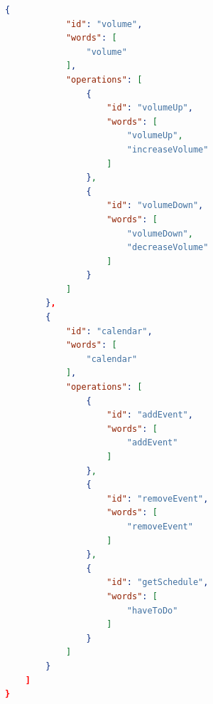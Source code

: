 \documentclass[twoside]{supsistudent}
\begin{document}
\begin{appendices}
\begin{lstlisting}[language=json,firstnumber=1]
        {
            "id": "volume",
            "words": [
                "volume"
            ],
            "operations": [
                {
                    "id": "volumeUp",
                    "words": [
                        "volumeUp",
                        "increaseVolume"
                    ]
                },
                {
                    "id": "volumeDown",
                    "words": [
                        "volumeDown",
                        "decreaseVolume"
                    ]
                }
            ]
        },
        {
            "id": "calendar",
            "words": [
                "calendar"
            ],
            "operations": [
                {
                    "id": "addEvent",
                    "words": [
                        "addEvent"
                    ]
                },
                {
                    "id": "removeEvent",
                    "words": [
                        "removeEvent"
                    ]
                },
                {
                    "id": "getSchedule",
                    "words": [
                        "haveToDo"
                    ]
                }
            ]
        }
    ]
}
\end{lstlisting}

\end{appendices}
\end{document}
